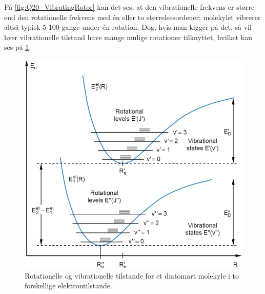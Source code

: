 På \cref{fig:Q20_VibratingRotor} kan det ses, at den vibrationelle frekvens er større end den rotationelle frekvens med én eller to størrelsesordener; molekylet vibrerer altså typisk 5-100 gange under én rotation. Dog, hvis man kigger på det, så vil hver vibrationelle tilstand have mange mulige rotationer tilknyttet, hvilket kan ses på \cref{fig:Q20_VibrationOgRotationPotential}.

\begin{figure}[!h]
    \centering
    \includegraphics[width=.8\textwidth]{Q20/images/VibrationOgRotationIPotentialDiatomartMolekyle.PNG}
    \caption{Rotationelle og vibrationelle tilstande for et diatomart molekyle i to forskellige elektrontilstande.}
    \label{fig:Q20_VibrationOgRotationPotential}
\end{figure}